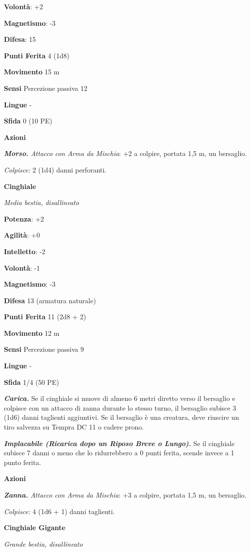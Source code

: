 \begin{multicols}{2}
\textbf{Volontà}: +2

\textbf{Magnetismo}: -3

\textbf{Difesa}: 15

\textbf{Punti Ferita} 4 (1d8)

\textbf{Movimento} 15 m

\textbf{Sensi} Percezione passiva 12

\textbf{Lingue} -

\textbf{Sfida} 0 (10 PE)

\textbf{Azioni}

\emph{\textbf{Morso.} Attacco con Arma da Mischia}: +2 a colpire,
portata 1,5 m, un bersaglio.

\emph{Colpisce:} 2 (1d4) danni perforanti.

\textbf{Cinghiale}

\emph{Media bestia, disallineato}

\textbf{Potenza}: +2

\textbf{Agilità}: +0

\textbf{Intelletto}: -2

\textbf{Volontà}: -1

\textbf{Magnetismo}: -3

\textbf{Difesa} 13 (armatura naturale)

\textbf{Punti Ferita} 11 (2d8 + 2)

\textbf{Movimento} 12 m

\textbf{Sensi} Percezione passiva 9

\textbf{Lingue} -

\textbf{Sfida} 1/4 (50 PE)

\emph{\textbf{Carica.}} Se il cinghiale si muove di almeno 6 metri
diretto verso il bersaglio e colpisce con un attacco di zanna durante lo
stesso turno, il bersaglio subisce 3 (1d6) danni taglienti aggiuntivi.
Se il bersaglio è una creatura, deve riuscire un tiro salvezza su Tempra
DC 11 o cadere prono.

\emph{\textbf{Implacabile (Ricarica dopo un Riposo Breve o Lungo).}} Se
il cinghiale subisce 7 danni o meno che lo ridurrebbero a 0 punti
ferita, scende invece a 1 punto ferita.

\textbf{Azioni}

\emph{\textbf{Zanna.} Attacco con Arma da Mischia}: +3 a colpire,
portata 1,5 m, un bersaglio.

\emph{Colpisce:} 4 (1d6 + 1) danni taglienti.

\textbf{Cinghiale Gigante}

\emph{Grande bestia, disallineato}


\end{multicols}
